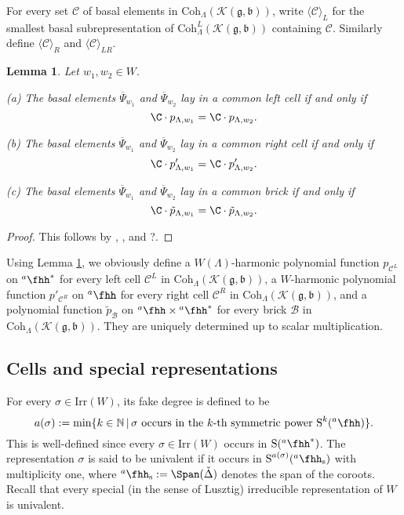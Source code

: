 \documentclass[12pt,a4paper]{amsart}
\newcommand{\BN}{{\mathbb {N}}}
\newcommand{\CB}{{\mathcal {B}}}
\newcommand{\CC}{{\mathcal {C}}}
\newcommand{\CK}{{\mathcal {K}}}
\newcommand{\oS}{\operatorname{S}}
\newcommand{\g}{\mathfrak g}
\renewcommand{\b}{\mathfrak b}
\newcommand{\la}{\langle}
\newcommand{\ra}{\rangle}
\numberwithin{equation}{section}
\newtheorem{lem}[thm]{Lemma}
\theoremstyle{remark}
\def\Irr{\mathrm{Irr}}
\def\hha{{}^a\fhh}
\def\Coh{\mathrm{Coh}}
\begin{document}
For every set $\CC$ of basal elements in $\Coh_{\Lambda}( \CK(\g,\b))$, write $\la \CC\ra_L$ for the smallest basal subrepresentation of $\Coh^L_{\Lambda}( \CK(\g,\b))$ containing $\CC$.
Similarly define $\la \CC\ra_R$ and $\la \CC\ra_{LR}$.



\begin{lem}\label{leftp}
Let  $w_1, w_2\in  W$.

\noindent
(a) The basal elements $\overline \Psi_{w_1}$ and $\overline \Psi_{w_2}$ lay in a common left cell if and only if
\[
\C\cdot p_{\Lambda, w_1}=\C\cdot p_{\Lambda, w_2}.
\]

\noindent
(b) The basal elements $\overline \Psi_{w_1}$ and $\overline \Psi_{w_2}$ lay in a common right cell if and only if
\[
\C\cdot p'_{\Lambda, w_1}=\C\cdot p'_{\Lambda, w_2}.
\]




\noindent
(c) The basal elements $\overline \Psi_{w_1}$ and $\overline \Psi_{w_2}$ lay in a common brick if and only if
\[
\C\cdot \tilde p_{\Lambda, w_1}=\C \cdot \tilde p_{\Lambda, w_2}.
\]

\end{lem}
\begin{proof}
This follows by , , \cite[Theorems 5.4 and 5.5]{J2} and ?\cite[Proposition 2.9]{j}.
\end{proof}

Using Lemma \ref{leftp}, we obviously define a $W(\Lambda)$-harmonic polynomial function   $p_{\CC^L}$  on $\hha^*$ for every left cell $\CC^L$ in $\Coh_{\Lambda}( \CK(\g,\b))$,   a $W$-harmonic  polynomial function $ p'_{\CC^R}$ on $\hha$  for every right cell $\CC^R$ in $\Coh_{\Lambda}( \CK(\g,\b))$, and a polynomial function $\tilde p_\CB$ on $\hha\times \hha^*$ for every brick $\CB$ in  $\Coh_{\Lambda}( \CK(\g,\b))$. They are uniquely determined up to scalar multiplication.


\subsection{Cells and special representations}

For every $\sigma\in \Irr(W)$, its fake degree is defined to be
 \begin{equation}\label{eq:fdeg}
 a(\sigma):=\min\{k\in \BN\,|\, \sigma \textrm{ occurs in the $k$-th symmetric power $\oS^k(\hha)$}\}.
 \end{equation}
This is well-defined since every  $\sigma\in \Irr(W)$ occurs in $\oS(\hha^*)$. The representation $\sigma$ is said to be univalent if it occurs in $\oS^{a(\sigma)}(\hha_{\mathrm s})$ with multiplicity one, where $\hha_{\mathrm s}:=\Span(\check \Delta)$ denotes the span of the coroots. Recall that every special  (in the sense of Lusztig) irreducible representation of $W$ is univalent.
\end{document}
